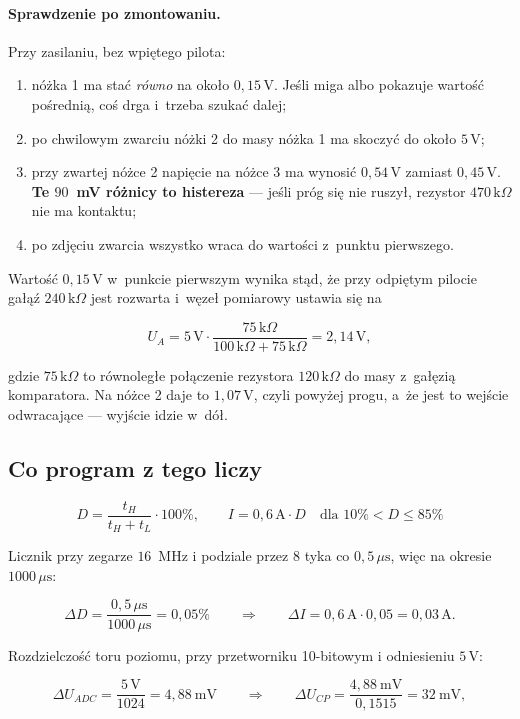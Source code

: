 \documentclass[a4paper,11pt]{article}
\newcommand{\kohm}{\,\mathrm{k}\Omega}
\newcommand{\volt}{\,\mathrm{V}}
\newcommand{\amp}{\,\mathrm{A}}
\newcommand{\us}{\,\mu\mathrm{s}}
\begin{document}
\paragraph{Sprawdzenie po zmontowaniu.} Przy zasilaniu, bez wpiętego pilota:

\begin{enumerate}
\item nóżka 1 ma stać \emph{równo} na około $0{,}15\volt$. Jeśli miga albo pokazuje
      wartość pośrednią, coś drga i~trzeba szukać dalej;
\item po chwilowym zwarciu nóżki 2 do masy nóżka 1 ma skoczyć do około $5\volt$;
\item przy zwartej nóżce 2 napięcie na nóżce 3 ma wynosić $0{,}54\volt$ zamiast
      $0{,}45\volt$. \textbf{Te $90$~mV różnicy to histereza} --- jeśli próg się nie
      ruszył, rezystor $470\kohm$ nie ma kontaktu;
\item po zdjęciu zwarcia wszystko wraca do wartości z~punktu pierwszego.
\end{enumerate}

Wartość $0{,}15\volt$ w~punkcie pierwszym wynika stąd, że przy odpiętym pilocie gałąź
$240\kohm$ jest rozwarta i~węzeł pomiarowy ustawia się na

\[
U_A = 5\volt\cdot\frac{75\kohm}{100\kohm+75\kohm}=2{,}14\volt ,
\]

gdzie $75\kohm$ to równoległe połączenie rezystora $120\kohm$ do masy z~gałęzią
komparatora. Na nóżce 2 daje to $1{,}07\volt$, czyli powyżej progu, a~że jest to
wejście odwracające --- wyjście idzie w~dół.

\subsection{Co program z tego liczy}

\begin{equation}
D=\frac{t_H}{t_H+t_L}\cdot100\%,
\qquad
I = 0{,}6\amp\cdot D \quad\text{dla } 10\% < D \le 85\%
\end{equation}

Licznik przy zegarze $16$~MHz i podziale przez $8$ tyka co $0{,}5\us$, więc na
okresie $1000\us$:

\[
\Delta D=\frac{0{,}5\us}{1000\us}=0{,}05\%
\qquad\Longrightarrow\qquad
\Delta I = 0{,}6\amp\cdot0{,}05=0{,}03\amp .
\]

Rozdzielczość toru poziomu, przy przetworniku 10-bitowym i odniesieniu $5\volt$:

\[
\Delta U_{ADC}=\frac{5\volt}{1024}=4{,}88\ \mathrm{mV}
\qquad\Longrightarrow\qquad
\Delta U_{CP}=\frac{4{,}88\ \mathrm{mV}}{0{,}1515}=32\ \mathrm{mV},
\]
\end{document}
